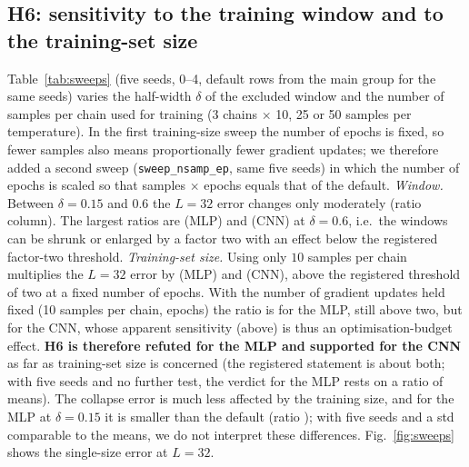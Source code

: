 \subsection{H6: sensitivity to the training window and to the training-set size}
Table~\ref{tab:sweeps} (five seeds, 0--4, default rows from the main group for the same seeds) varies the half-width $\delta$ of the excluded window and the number of samples per chain used for training (3 chains $\times$ 10, 25 or 50 samples per temperature). In the first training-size sweep the number of epochs is fixed, so fewer samples also means proportionally fewer gradient updates; we therefore added a second sweep (\texttt{sweep\_nsamp\_ep}, same five seeds) in which the number of epochs is scaled so that samples $\times$ epochs equals that of the default.
\emph{Window.} Between $\delta=0.15$ and $0.6$ the $L=32$ error changes only moderately (ratio column). The largest ratios are  (MLP) and  (CNN) at $\delta=0.6$, i.e.\ the windows can be shrunk or enlarged by a factor two with an effect below the registered factor-two threshold.
\emph{Training-set size.} Using only $10$ samples per chain multiplies the $L=32$ error by  (MLP) and  (CNN), above the registered threshold of two at a fixed number of epochs. With the number of gradient updates held fixed (10 samples per chain,  epochs) the ratio is  for the MLP, still above two, but  for the CNN, whose apparent sensitivity (above) is thus an optimisation-budget effect. \textbf{H6 is therefore refuted for the MLP and supported for the CNN} as far as training-set size is concerned (the registered statement is about both; with five seeds and no further test, the verdict for the MLP rests on a ratio of means). The collapse error is much less affected by the training size, and for the MLP at $\delta=0.15$ it is smaller than the default (ratio ); with five seeds and a std comparable to the means, we do not interpret these differences. Fig.~\ref{fig:sweeps} shows the single-size error at $L=32$.

\begin{table}[t]\centering\caption{Sensitivity (five seeds, mean): $|\hat T_c-T_c|$ at $L=16$, $L=32$, after collapse, and the ratio of the $L=32$ error to the default setting (margin $0.3$, $50$ samples/chain). ``scaled ep.'': epochs scaled to keep the number of gradient updates fixed.}\label{tab:sweeps}
\resizebox{\columnwidth}{!}{}
\end{table}

